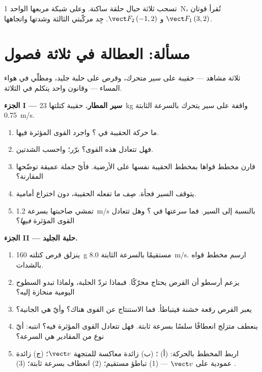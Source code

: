 \begin{exercise}[$\star\star\star$]\label{exo:g10:inertia:15}
تسحب ثلاثة حبال حلقة ساكنة. وعلى شبكة مربعها الواحد
\qty{1}{N}، تُقرأ قوتان $\vect F_1\,(3, 2)$ و
$\vect F_2\,(-1, 2)$. جِد مركّبتي  الثالثة وشدتها
واتجاهها.
\end{exercise}

\section{مسألة: العطالة في ثلاثة فصول}

\begin{problem}
\label{pb:g10:inertia:1}
ثلاثة مشاهد --- حقيبة على سير متحرك، وقرص على حلبة جليد،
ومظلّي في هواء المساء --- وقانون واحد يتكلم في الثلاثة.

\medskip
\noindent\textbf{الجزء I --- سير المطار.}
حقيبة كتلتها \qty{23}{kg} واقفة على سير يتحرك بالسرعة
الثابتة \qty{0.75}{m/s}.
\begin{enumerate}
  \item ما حركة الحقيبة في ؟ واجرد القوى المؤثرة فيها.
  \item فهل تتعادل هذه القوى؟ برّر؛ واحسب الشدتين.
  \item قارن مخطط قواها بمخطط الحقيبة نفسها على
        الأرضية. فأيّ جملة عميقة توضّحها المقارنة؟
  \item يتوقف السير فجأة. صِف ما تفعله الحقيبة،
        دون اختراع  أمامية.
  \item تمشي صاحبتها بسرعة \qty{1.2}{m/s} بالنسبة إلى السير. فما
        سرعتها في ؟ وهل تتعادل القوى المؤثرة \emph{فيها}؟
\end{enumerate}

\medskip
\noindent\textbf{الجزء II --- حلبة الجليد.}
\begin{enumerate}[resume]
  \item ينزلق قرص كتلته \qty{160}{g} مستقيمًا بالسرعة الثابتة
        \qty{8.0}{m/s}. ارسم مخطط قواه بالشدات.
  \item يزعم أرسطو أن القرص يحتاج محرّكًا. فبماذا تردّ الحلبة،
        ولماذا تبدو السطوح اليومية منحازة إليه؟
  \item يعبر القرص رقعة خشنة فيتباطأ. فما الاستنتاج عن
        القوى هناك؟ وأيّ  هي الجانية؟
  \item ينعطف متزلج انعطافًا سلسًا بسرعة ثابتة. فهل تتعادل القوى المؤثرة
        فيه؟ انتبه: أيّ نوع من المقادير هي السرعة؟
  \item اربط المخطط بالحركة: (أ) ؛ (ب)  زائدة
        معاكسة للمتجهة $\vect v$؛ (ج)  زائدة عمودية على
        $\vect v$ --- (1) تباطؤ مستقيم؛ (2) انعطاف بسرعة
        ثابتة؛ (3) .
\end{enumerate}


\end{problem}

